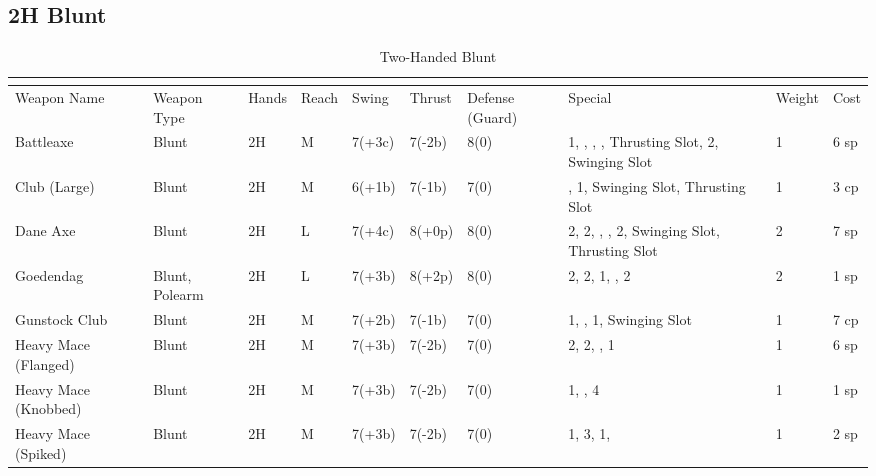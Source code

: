 \documentclass[oneside,11pt,english]{book}
\begin{document}
\subsection{2H Blunt}\vspace{-15pt}
\begin{longtabu} to 1\linewidth {X[2,l]XX[-1,c]X[-1,c]XXX[-1,c]X[2,l]X[-3,c]X[-3,r]}
	\captionsetup{labelformat=blank,textformat=empty}
	\caption{Two-Handed Blunt}\vspace{-15pt}
	\label{tab:2H Blunt}\\\endfirsthead
Weapon Name				&Weapon Type	&Hands	&Reach	&Swing&Thrust&Defense (Guard)&Special																	&Weight	&Cost\\\toprule\endhead
Battleaxe				&Blunt			&2H		&M		&7(+3c)&7(-2b)&8(0)& 1, , , , Thrusting Slot,  2, Swinging Slot	&1 &6 sp\\
Club (Large) 			&Blunt			&2H		&M		&6(+1b)&7(-1b)&7(0)&,  1, Swinging Slot, Thrusting Slot								&1 &3 cp\\
Dane Axe 				&Blunt			&2H		&L		&7(+4c)&8(+0p)&8(0)& 2,  2, , ,  2, Swinging Slot, Thrusting Slot	&2 &7 sp\\
Goedendag 				&Blunt, Polearm	&2H		&L		&7(+3b)&8(+2p)&8(0)& 2,  2,  1, ,  2							&2 &1 sp\\
Gunstock Club 			&Blunt			&2H		&M		&7(+2b)&7(-1b)&7(0)& 1, ,  1, Swinging Slot									&1 &7 cp\\
Heavy Mace (Flanged)	&Blunt			&2H		&M		&7(+3b)&7(-2b)&7(0)& 2,  2, ,  1										&1 &6 sp\\
Heavy Mace (Knobbed)	&Blunt			&2H		&M		&7(+3b)&7(-2b)&7(0)& 1, ,  4													&1 &1 sp\\
Heavy Mace (Spiked) 	&Blunt			&2H		&M		&7(+3b)&7(-2b)&7(0)& 1,  3,  1, 										&1 &2 sp\\

\end{longtabu}
\end{document}
